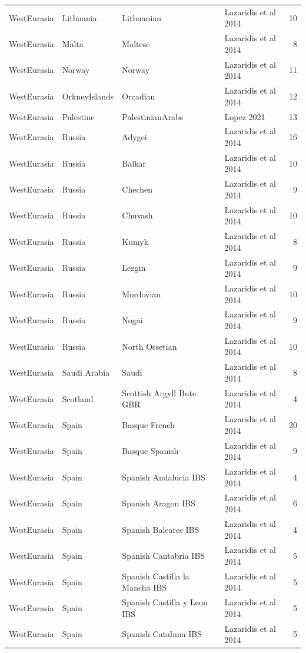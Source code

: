 \begin{longtable}[t]{lll>{\raggedright\arraybackslash}p{9em}r}
WestEurasia & Lithuania & Lithuanian & Lazaridis et al 2014 & 10\\
WestEurasia & Malta & Maltese & Lazaridis et al 2014 & 8\\
WestEurasia & Norway & Norway & Lazaridis et al 2014 & 11\\
WestEurasia & OrkneyIslands & Orcadian & Lazaridis et al 2014 & 12\\
WestEurasia & Palestine & PalestinianArabs & Lopez 2021 & 13\\
WestEurasia & Russia & Adygei & Lazaridis et al 2014 & 16\\
WestEurasia & Russia & Balkar & Lazaridis et al 2014 & 10\\
WestEurasia & Russia & Chechen & Lazaridis et al 2014 & 9\\
WestEurasia & Russia & Chuvash & Lazaridis et al 2014 & 10\\
WestEurasia & Russia & Kumyk & Lazaridis et al 2014 & 8\\
WestEurasia & Russia & Lezgin & Lazaridis et al 2014 & 9\\
WestEurasia & Russia & Mordovian & Lazaridis et al 2014 & 10\\
WestEurasia & Russia & Nogai & Lazaridis et al 2014 & 9\\
WestEurasia & Russia & North Ossetian & Lazaridis et al 2014 & 10\\
WestEurasia & Saudi Arabia & Saudi & Lazaridis et al 2014 & 8\\
WestEurasia & Scotland & Scottish Argyll Bute GBR & Lazaridis et al 2014 & 4\\
WestEurasia & Spain & Basque French & Lazaridis et al 2014 & 20\\
WestEurasia & Spain & Basque Spanish & Lazaridis et al 2014 & 9\\
WestEurasia & Spain & Spanish Andalucia IBS & Lazaridis et al 2014 & 4\\
WestEurasia & Spain & Spanish Aragon IBS & Lazaridis et al 2014 & 6\\
WestEurasia & Spain & Spanish Baleares IBS & Lazaridis et al 2014 & 4\\
WestEurasia & Spain & Spanish Cantabria IBS & Lazaridis et al 2014 & 5\\
WestEurasia & Spain & Spanish Castilla la Mancha IBS & Lazaridis et al 2014 & 5\\
WestEurasia & Spain & Spanish Castilla y Leon IBS & Lazaridis et al 2014 & 5\\
WestEurasia & Spain & Spanish Cataluna IBS & Lazaridis et al 2014 & 5\\

\end{longtable}
